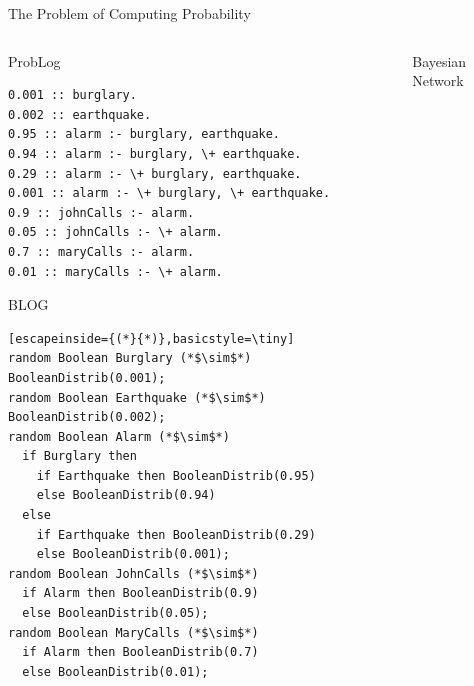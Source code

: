 \documentclass{beamer}
\begin{document}
\begin{frame}[fragile]{The Problem of Computing Probability}
  \vspace{-0.75cm}
  \begin{columns}[t]
    \begin{column}{0.6\textwidth}
      \centering
      \begin{block}{ProbLog}
        \vspace{-0.3cm}
        \begin{lstlisting}[basicstyle=\tiny]
0.001 :: burglary.
0.002 :: earthquake.
0.95 :: alarm :- burglary, earthquake.
0.94 :: alarm :- burglary, \+ earthquake.
0.29 :: alarm :- \+ burglary, earthquake.
0.001 :: alarm :- \+ burglary, \+ earthquake.
0.9 :: johnCalls :- alarm.
0.05 :: johnCalls :- \+ alarm.
0.7 :: maryCalls :- alarm.
0.01 :: maryCalls :- \+ alarm.
        \end{lstlisting}
        \vspace{-0.2cm}
      \end{block}
      \vspace{-0.25cm}
      \begin{block}{BLOG}
        \vspace{-0.3cm}
        \begin{lstlisting}[escapeinside={(*}{*)},basicstyle=\tiny]
random Boolean Burglary (*$\sim$*) BooleanDistrib(0.001);
random Boolean Earthquake (*$\sim$*) BooleanDistrib(0.002);
random Boolean Alarm (*$\sim$*)
  if Burglary then
    if Earthquake then BooleanDistrib(0.95)
    else BooleanDistrib(0.94)
  else
    if Earthquake then BooleanDistrib(0.29)
    else BooleanDistrib(0.001);
random Boolean JohnCalls (*$\sim$*)
  if Alarm then BooleanDistrib(0.9)
  else BooleanDistrib(0.05);
random Boolean MaryCalls (*$\sim$*)
  if Alarm then BooleanDistrib(0.7)
  else BooleanDistrib(0.01);
        \end{lstlisting}
        \vspace{-0.2cm}
      \end{block}
    \end{column}
    \begin{column}{0.35\textwidth}
      \begin{block}{Bayesian Network}
        \centering
\end{block}
\end{column}
\end{columns}
\end{frame}
\end{document}
